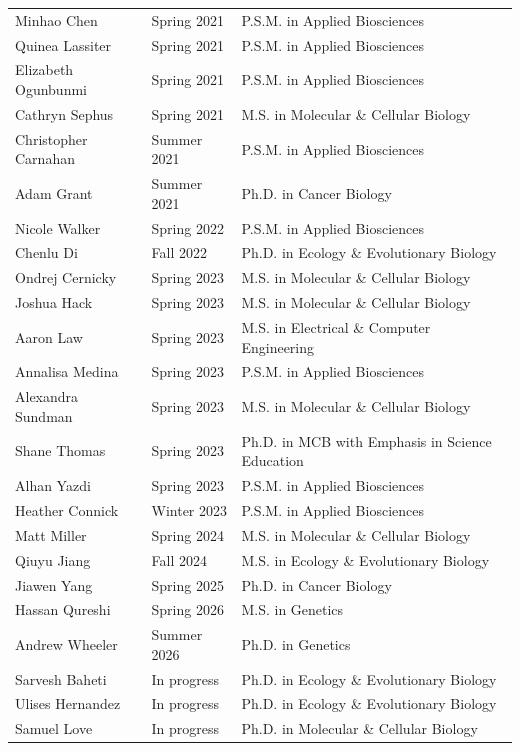 \documentclass[11pt]{article}
\begin{document}
\begin{longtable}[l]{l l l}
Minhao Chen & Spring 2021 & P.S.M. in Applied Biosciences\\
Quinea Lassiter & Spring 2021 & P.S.M. in Applied Biosciences\\
Elizabeth Ogunbunmi & Spring 2021 & P.S.M. in Applied Biosciences\\
Cathryn Sephus & Spring 2021 & M.S. in Molecular \& Cellular Biology\\
Christopher Carnahan & Summer 2021 & P.S.M. in Applied Biosciences\\
Adam Grant & Summer 2021 & Ph.D. in Cancer Biology\\
Nicole Walker & Spring 2022 & P.S.M. in Applied Biosciences\\
Chenlu Di & Fall 2022 & Ph.D. in Ecology \& Evolutionary Biology\\
Ondrej Cernicky & Spring 2023 & M.S. in Molecular \& Cellular Biology\\
Joshua Hack & Spring 2023 & M.S. in Molecular \& Cellular Biology\\
Aaron Law & Spring 2023 & M.S. in Electrical \& Computer Engineering\\ %
Annalisa Medina & Spring 2023 & P.S.M. in Applied Biosciences\\ 
Alexandra Sundman & Spring 2023 & M.S. in Molecular \& Cellular Biology\\ 
Shane Thomas & Spring 2023 & Ph.D. in MCB with Emphasis in Science Education\\ 
Alhan Yazdi & Spring 2023 & P.S.M. in Applied Biosciences\\
Heather Connick & Winter 2023 & P.S.M. in Applied Biosciences\\
Matt Miller & Spring 2024 & M.S. in Molecular \& Cellular Biology\\ 
Qiuyu Jiang & Fall 2024 & M.S. in Ecology \& Evolutionary Biology\\
Jiawen Yang & Spring 2025 & Ph.D. in Cancer Biology\\
Hassan Qureshi & Spring 2026 & M.S. in Genetics\\
Andrew Wheeler & Summer 2026 & Ph.D. in Genetics\\
Sarvesh Baheti & In progress & Ph.D. in Ecology \& Evolutionary Biology\\
Ulises Hernandez & In progress & Ph.D. in Ecology \& Evolutionary Biology\\
Samuel Love & In progress & Ph.D. in Molecular \& Cellular Biology\\

\end{longtable}
\end{document}
